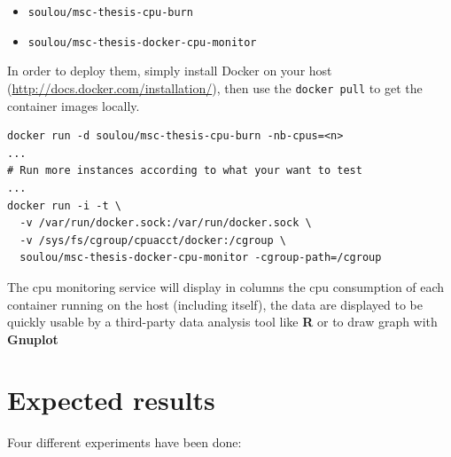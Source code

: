 \begin{itemize}
	\item{\texttt{soulou/msc-thesis-cpu-burn}}
	\item{\texttt{soulou/msc-thesis-docker-cpu-monitor}}
\end{itemize}

In order to deploy them, simply install Docker on your host
(\url{http://docs.docker.com/installation/}), then use the \texttt{docker pull}
to get the container images locally.

\vspace{1em}

\begin{lstlisting}
docker run -d soulou/msc-thesis-cpu-burn -nb-cpus=<n>
...
# Run more instances according to what your want to test
...
docker run -i -t \
  -v /var/run/docker.sock:/var/run/docker.sock \
  -v /sys/fs/cgroup/cpuacct/docker:/cgroup \
  soulou/msc-thesis-docker-cpu-monitor -cgroup-path=/cgroup
\end{lstlisting}

The cpu monitoring service will display in columns the cpu consumption
of each container running on the host (including itself), the data are
displayed to be quickly usable by a third-party data analysis tool like
\textbf{R} or to draw graph with \textbf{Gnuplot}

\section{Expected results}

Four different experiments have been done:

